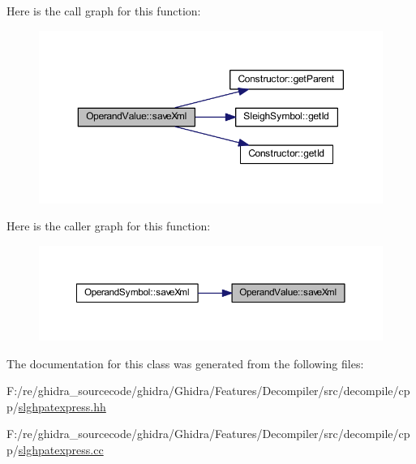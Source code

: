 Here is the call graph for this function\+:
\nopagebreak
\begin{figure}[H]
\begin{center}
\leavevmode
\includegraphics[width=350pt]{class_operand_value_a106fcb5ccb3fd95a0d97efffd622bc5d_cgraph}
\end{center}
\end{figure}
Here is the caller graph for this function\+:
\nopagebreak
\begin{figure}[H]
\begin{center}
\leavevmode
\includegraphics[width=350pt]{class_operand_value_a106fcb5ccb3fd95a0d97efffd622bc5d_icgraph}
\end{center}
\end{figure}


The documentation for this class was generated from the following files\+:\begin{DoxyCompactItemize}
\item 
F\+:/re/ghidra\+\_\+sourcecode/ghidra/\+Ghidra/\+Features/\+Decompiler/src/decompile/cpp/\mbox{\hyperlink{slghpatexpress_8hh}{slghpatexpress.\+hh}}\item 
F\+:/re/ghidra\+\_\+sourcecode/ghidra/\+Ghidra/\+Features/\+Decompiler/src/decompile/cpp/\mbox{\hyperlink{slghpatexpress_8cc}{slghpatexpress.\+cc}}\end{DoxyCompactItemize}
